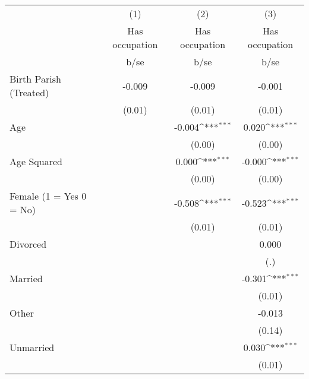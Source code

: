{
\def\sym#1{\ifmmode^{#1}\else\(^{#1}\)\fi}
\begin{tabular}{l*{3}{c}}
\hline\hline
                    &\multicolumn{1}{c}{(1)}&\multicolumn{1}{c}{(2)}&\multicolumn{1}{c}{(3)}\\
                    &\multicolumn{1}{c}{Has occupation}&\multicolumn{1}{c}{Has occupation}&\multicolumn{1}{c}{Has occupation}\\
                    &        b/se         &        b/se         &        b/se         \\
\hline
Birth Parish (Treated)&      -0.009         &      -0.009         &      -0.001         \\
                    &      (0.01)         &      (0.01)         &      (0.01)         \\
Age                 &                     &      -0.004\sym{***}&       0.020\sym{***}\\
                    &                     &      (0.00)         &      (0.00)         \\
Age Squared         &                     &       0.000\sym{***}&      -0.000\sym{***}\\
                    &                     &      (0.00)         &      (0.00)         \\
Female (1 = Yes 0 = No)&                     &      -0.508\sym{***}&      -0.523\sym{***}\\
                    &                     &      (0.01)         &      (0.01)         \\
Divorced            &                     &                     &       0.000         \\
                    &                     &                     &         (.)         \\
Married             &                     &                     &      -0.301\sym{***}\\
                    &                     &                     &      (0.01)         \\
Other               &                     &                     &      -0.013         \\
                    &                     &                     &      (0.14)         \\
Unmarried           &                     &                     &       0.030\sym{***}\\
                    &                     &                     &      (0.01)         \\

\end{tabular}}
